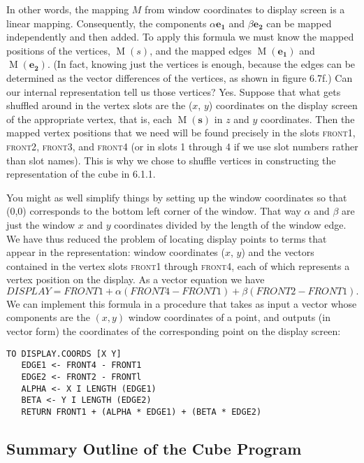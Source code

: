 \documentclass{book}
\begin{document}
In other words, the mapping $M$ from window coordinates to display
screen is a linear mapping. Consequently, the components $\alpha \mathbf{e_1}$ and $\beta \mathbf{e_2}$
can be mapped independently and then added. To apply this formula
we must know the mapped positions of the vertices, $\operatorname{M}(s)$, and the
mapped edges $\operatorname{M}(\mathbf{e_1})$ and $\operatorname{M}(\mathbf{e_2})$. (In fact, knowing just the vertices
is enough, because the edges can be determined as the vector differences
of the vertices, as shown in figure 6.7f.) Can our internal representation
tell us those vertices? Yes. Suppose that what gets shuffled around in
the vertex slots are the ($x$, $y$) coordinates on the display screen of the
appropriate vertex, that is, each $\operatorname{M}(\mathbf{s})$ in $z$ and $y$ coordinates. Then the
mapped vertex positions that we need will be found precisely in the slots
\textsc{front1}, \textsc{front2}, \textsc{front3}, and \textsc{front4} (or in slots 1 through 4 if we use
slot numbers rather than slot names). This is why we chose to shuffle
vertices in constructing the representation of the cube in 6.1.1.

You might as well simplify things by setting up the window coordinates
so that (0,0) corresponds to the bottom left corner of the window.
That way $\alpha$ and $\beta$ are just the window $x$ and $y$ coordinates divided
by the length of the window edge. We have thus reduced the problem
of locating display points to terms that appear in the representation:
window coordinates ($x$, $y$) and the vectors contained in the vertex slots
\textsc{front1} through \textsc{front4}, each of which represents a vertex position on
the display. As a vector equation we have
$$DISPLAY = FRONT1 + \alpha (FRONT4 - FRONT1) + \beta (FRONT2 - FRONT1).$$
 We can implement this formula in a procedure that takes as input a
vector whose components are the $(x, y)$ window coordinates of a point,
and outputs (in vector form) the coordinates of the corresponding point
on the display screen:

\begin{verbatim}
TO DISPLAY.COORDS [X Y]
   EDGE1 <- FRONT4 - FRONT1
   EDGE2 <- FRONT2 - FRONTl
   ALPHA <- X I LENGTH (EDGE1)
   BETA <- Y I LENGTH (EDGE2)
   RETURN FRONT1 + (ALPHA * EDGE1) + (BETA * EDGE2)
\end{verbatim}
\subsection{Summary Outline of the Cube Program}
\end{document}
